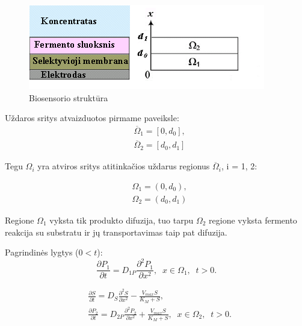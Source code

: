 \documentclass[12pt, a4paper, lithuanian]{article}
\begin{document}
\begin{figure}[H]
    \centering
    \includegraphics[scale=0.9]{img/modv1}
    \caption{Biosensorio struktūra}
    \label{img:mlp}
\end{figure}

Uždaros sritys atvaizduotos pirmame paveiksle:
\begin{equation}
\begin{aligned}
    &\overline{\Omega}_1 = [0, d_0],\\
    &\overline{\Omega}_2 = [d_0, d_1]
\end{aligned}
\end{equation}

Tegu $\Omega_i$ yra atviros sritys atitinkačios uždarus regionus
$\overline{\Omega}_i$, i = 1, 2:

\begin{equation}
\begin{aligned}
    &\Omega_1 = (0, d_0),\\
    &\Omega_2 = (d_0, d_1)
\end{aligned}
\end{equation}

Regione $\Omega_1$ vyksta tik produkto
difuzija, tuo tarpu $\Omega_2$ regione vyksta fermento
reakcija su substratu ir jų transportavimas taip pat difuzija.

Pagrindinės lygtys ($0<t$):
\begin{equation}
    \frac{\partial P_1}{\partial t} = D_{1P} \frac{\partial^2 P_1}{\partial x^2}, \;
    \; x \in \Omega_1,\;\; t > 0.
\end{equation}

\begin{equation}
\begin{aligned} 
    &\frac{\partial S}{\partial t} = D_S \frac{\partial^2 S}{\partial x^2} -
    \frac{V_{max} S}{K_M + S},  \\ 
    &\frac{\partial P_2}{\partial t} = D_{2P} \frac{\partial^2 P_2}{\partial x^2} +
    \frac{V_{max} S}{K_M + S}, \; \; x \in \Omega_2 ,\;\; t > 0.
\end{aligned}
\end{equation}
\end{document}
